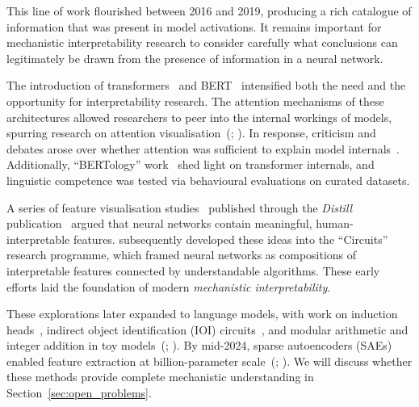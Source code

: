 This line of work flourished between 2016 and 2019, producing a rich catalogue of information that was present in model activations. 
It remains important for mechanistic interpretability research to consider carefully what conclusions can legitimately be drawn from the presence of information in a neural network. 

The introduction of transformers~ and BERT~ intensified both the need and the opportunity for interpretability research. 
The attention mechanisms of these architectures allowed researchers to peer into the internal workings of models, spurring research on attention visualisation~(; ). In response, criticism and debates arose over whether attention was sufficient to explain model internals~. Additionally, ``BERTology'' work~ shed light on transformer internals, and linguistic competence was tested via behavioural evaluations on curated datasets.


A series of feature visualisation studies~ published through the \emph{Distill} publication~ argued that neural networks contain meaningful, human-interpretable features.  subsequently developed these ideas into the ``Circuits'' research programme, which framed neural networks as compositions of interpretable features connected by understandable algorithms. These early efforts laid the foundation of modern \emph{mechanistic interpretability}. 

These explorations later expanded to language models, with work on induction heads~, indirect object identification (IOI) circuits~, and modular arithmetic and integer addition in toy models~(; ). By mid-2024, sparse autoencoders (SAEs) enabled feature extraction at billion-parameter scale~(; ). We will discuss whether these methods provide complete mechanistic understanding in Section~\ref{sec:open_problems}.






